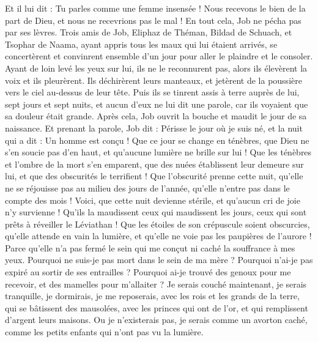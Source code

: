 \begin{multicols}{2}
Et il lui dit : Tu parles comme une femme insensée ! Nous recevons le bien de la part de Dieu, et nous ne recevrions pas le mal ! En tout cela, Job ne pécha pas par ses lèvres.
Trois amis de Job, Eliphaz de Théman, Bildad de Schuach, et Tsophar de Naama, ayant appris tous les maux qui lui étaient arrivés, se concertèrent et convinrent ensemble d'un jour pour aller le plaindre et le consoler.
Ayant de loin levé les yeux sur lui, ils ne le reconnurent pas, alors ils élevèrent la voix et ils pleurèrent. Ils déchirèrent leurs manteaux, et jetèrent de la poussière vers le ciel au-dessus de leur tête.
Puis ils se tinrent assis à terre auprès de lui, sept jours et sept nuits, et aucun d'eux ne lui dit une parole, car ils voyaient que sa douleur était grande.
\VerseOne{}Après cela, Job ouvrit la bouche et maudit le jour de sa naissance.
Et prenant la parole, Job dit :
Périsse le jour où je suis né, et la nuit qui a dit : Un homme est conçu !
Que ce jour se change en ténèbres, que Dieu ne s'en soucie pas d'en haut, et qu'aucune lumière ne brille sur lui !
Que les ténèbres et l'ombre de la mort s'en emparent, que des nuées établissent leur demeure sur lui, et que des obscurités le terrifient !
Que l'obscurité prenne cette nuit, qu'elle ne se réjouisse pas au milieu des jours de l'année, qu'elle n'entre pas dans le compte des mois !
Voici, que cette nuit devienne stérile, et qu'aucun cri de joie n'y survienne !
Qu’ils la maudissent ceux qui maudissent les jours, ceux qui sont prêts à réveiller le Léviathan !
Que les étoiles de son crépuscule soient obscurcies, qu'elle attende en vain la lumière, et qu'elle ne voie pas les paupières de l'aurore !
Parce qu'elle n'a pas fermé le sein qui me conçut ni caché la souffrance à mes yeux.
Pourquoi ne suis-je pas mort dans le sein de ma mère ? Pourquoi n'ai-je pas expiré au sortir de ses entrailles ?
Pourquoi ai-je trouvé des genoux pour me recevoir, et des mamelles pour m'allaiter ?
Je serais couché maintenant, je serais tranquille, je dormirais, je me reposerais,
avec les rois et les grands de la terre, qui se bâtissent des mausolées,
avec les princes qui ont de l'or, et qui remplissent d'argent leurs maisons.
Ou je n'existerais pas, je serais comme un avorton caché, comme les petits enfants qui n'ont pas vu la lumière.

\end{multicols}
